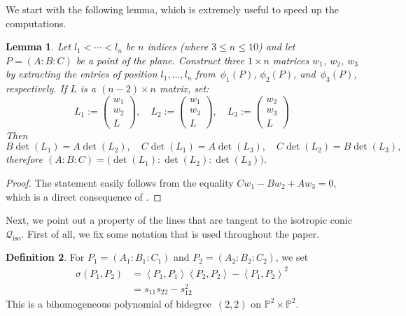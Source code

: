 \documentclass[a4paper, 11pt, reqno]{amsart}
\theoremstyle{plain}
\newtheorem{lemma}{Lemma}[section]
\theoremstyle{definition}
\newtheorem{definition}[lemma]{Definition}
\newcommand{\p}{\mathbb{P}}
\newcommand{\iso}{\mathcal{Q}_{\mathrm{iso}}}
\newcommand{\scl}[2]{\left\langle {#1}, {#2} \right\rangle}
\begin{document}
We start with the following lemma, which is extremely useful
to speed up the computations.

\begin{lemma}
\label{lemma:minors}
Let $l_1 < \cdots <l_n$ be $n$ indices (where $3 \leq n \leq 10$) and let $P = (A: B: C)$ be a point of the plane.
Construct three $1 \times n$ matrices $w_1$, $w_2$, $w_3$ by extracting the entries of position $l_1, \dotsc, l_n$ from~$\phi_1(P)$, $\phi_2(P)$, and~$\phi_3(P)$, respectively. If $L$ is a $(n-2) \times n$ matrix, set:
%
\[
  L_1 := \left( \begin{array}{c} w_1 \\ w_2 \\ L \end{array} \right), \quad
  L_2 := \left( \begin{array}{c} w_1 \\ w_3 \\ L \end{array} \right), \quad
  L_3 := \left( \begin{array}{c} w_2 \\ w_3 \\ L \end{array} \right)
\]
%
Then
%
\[
  B \det(L_1) = A \det(L_2), \quad
  C \det(L_1) = A \det(L_3), \quad
  C \det(L_2) = B \det(L_3),
\]
%
therefore $(A: B: C) = \bigl( \det(L_1): \det(L_2): \det(L_3) \bigr)$.
\end{lemma}
\begin{proof}
The statement easily follows from the equality $C w_1 - B w_2 + A w_3 = 0$, which is a direct consequence of .
\end{proof}



Next, we point out a property of the lines that are tangent to the isotropic conic~$\iso$.
First of all, we fix some notation that is used throughout the paper.

\begin{definition}
\label{definition:sigma}
For $P_1 = (A_1: B_1: C_1)$ and $P_2 = (A_2: B_2: C_2)$, we set
%
\begin{equation}
\label{formula:sigma}
\begin{aligned}
  \sigma(P_1, P_2) &= \scl{P_1}{P_1} \scl{P_2}{P_2} - \scl{P_1}{P_2}^2 \\
   &= s_{11}s_{22}-s_{12}^2
\end{aligned}
\end{equation}
%
This is a bihomogeneous polynomial of bidegree~$(2,2)$ on $\p^2 \times \p^2$.
\end{definition}
\end{document}
